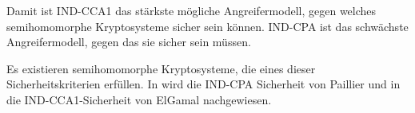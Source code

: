 \begin{framed}  
Damit ist IND-CCA1 das stärkste mögliche Angreifermodell, gegen welches semihomomorphe Kryptosysteme sicher sein können. IND-CPA ist das schwächste Angreifermodell, gegen das sie sicher sein müssen.
\end{framed}  

Es existieren semihomomorphe Kryptosysteme, die eines dieser Sicherheitskriterien erfüllen. In \cite[p.231]{paillier1999public} wird die IND-CPA Sicherheit von Paillier und in \cite[p.7]{wu2008security} die IND-CCA1-Sicherheit von ElGamal nachgewiesen.